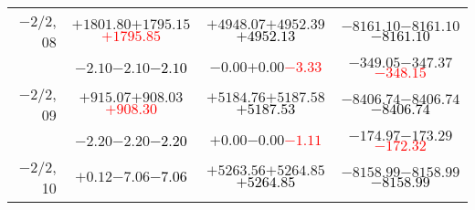 \documentclass[compress]{beamer}
\begin{document}
\begin{frame}
{\begin{tabular}{r | c | c | c}
$-$2/2, 08 & $+1801.80$\hspace{0.1 cm}$+1795.15$\hspace{0.1 cm}\textcolor{red}{$+1795.85$} & $+4948.07$\hspace{0.1 cm}$+4952.39$\hspace{0.1 cm}\textcolor{black}{$+4952.13$} & $-8161.10$\hspace{0.1 cm}$-8161.10$\hspace{0.1 cm}\textcolor{black}{$-8161.10$} \\
           & $-2.10$\hspace{0.1 cm}$-2.10$\hspace{0.1 cm}\textcolor{black}{$-2.10$} & $-0.00$\hspace{0.1 cm}$+0.00$\hspace{0.1 cm}\textcolor{red}{$-3.33$} & $-349.05$\hspace{0.1 cm}$-347.37$\hspace{0.1 cm}\textcolor{red}{$-348.15$} \\
$-$2/2, 09 & $+915.07$\hspace{0.1 cm}$+908.03$\hspace{0.1 cm}\textcolor{red}{$+908.30$} & $+5184.76$\hspace{0.1 cm}$+5187.58$\hspace{0.1 cm}\textcolor{black}{$+5187.53$} & $-8406.74$\hspace{0.1 cm}$-8406.74$\hspace{0.1 cm}\textcolor{black}{$-8406.74$} \\
           & $-2.20$\hspace{0.1 cm}$-2.20$\hspace{0.1 cm}\textcolor{black}{$-2.20$} & $+0.00$\hspace{0.1 cm}$-0.00$\hspace{0.1 cm}\textcolor{red}{$-1.11$} & $-174.97$\hspace{0.1 cm}$-173.29$\hspace{0.1 cm}\textcolor{red}{$-172.32$} \\
$-$2/2, 10 & $+0.12$\hspace{0.1 cm}$-7.06$\hspace{0.1 cm}\textcolor{black}{$-7.06$} & $+5263.56$\hspace{0.1 cm}$+5264.85$\hspace{0.1 cm}\textcolor{black}{$+5264.85$} & $-8158.99$\hspace{0.1 cm}$-8158.99$\hspace{0.1 cm}\textcolor{black}{$-8158.99$} \\

\end{tabular}}
\end{frame}
\end{document}
